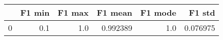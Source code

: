 \begin{tabular}{lrrrrr}
\toprule
{} &  F1 min &  F1 max &   F1 mean &  F1 mode &    F1 std \\
\midrule
0 &     0.1 &     1.0 &  0.992389 &      1.0 &  0.076975 \\
\bottomrule
\end{tabular}
